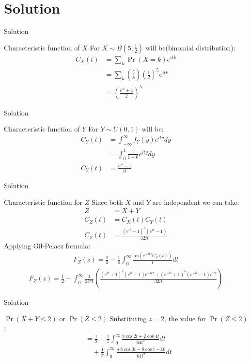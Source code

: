 \documentclass{beamer}
\providecommand{\pr}[1]{\ensuremath{\Pr\left(#1\right)}}
\begin{document}
\section{Solution}
\begin{frame}{Solution}
    \begin{block}{Characteristic function of $X$ }
    For $X \sim B\left(5,\frac{1}{2}\right)$ will be(binomial distribution):
\begin{align}
C_X(t) &= \sum_{k}\pr{X=k}e^{itk}\\
&= \sum_{k}{5 \choose k}{\left(\frac{1}{2}\right)}^5e^{itk}\\
   &=\left(\frac{e^{it}+1}{2}\right)^5
\end{align}
    \end{block}
\end{frame}
\begin{frame}{Solution}
    \begin{block}{Characteristic function of $Y$ }
    For $Y \sim U(0,1)$ will be:
\begin{align}
C_Y(t) &= \int_{-\infty}^\infty f_Y(y)e^{ity}dy\\
&= \int_{0}^1\frac{1}{1-0}e^{ity}dy\\
    C_Y(t)&=\frac{e^{it}-1}{it}
\end{align}
    \end{block}
\end{frame}
\begin{frame}{Solution}
\begin{block}{Characteristic function for $Z$}
Since both $X$ and $Y$ are independent we can take:
\begin{align}
    Z&=X+Y\\
    C_Z(t)&=C_X(t)C_Y(t)\\
    C_Z(t)&= \frac{(e^{it}+1)^5(e^{it}-1)}{32it}
\end{align}
Applying Gil-Pelaez formula:
\begin{align}
    F_Z(z)=\frac{1}{2}-\frac{1}{\pi}\int_0^\infty \frac{\text{Im}\left(e^{-itz}C_Z(t)\right)}{t}dt
\end{align}
\begin{align}
    F_Z(z)=\frac{1}{2}-\int_0^\infty\frac{1}{2i\pi t}\left(\frac{(e^{it}+1)^5(e^{it}-1)e^{-itz}+(e^{-it}+1)^5(e^{-it}-1)e^{itz}}{32it}\right)
\end{align}
\end{block}
\end{frame}
\begin{frame}{Solution}
    \begin{block}{$\pr{X+Y \leq 2}$ or $\pr{Z\leq 2}$}
    Substituting $z=2$, the value for $\pr{Z\leq 2}$:
\begin{align}
\nonumber
    &=\frac{1}{2}+\frac{1}{\pi}\int_0^\infty \frac{8\cos{2t}+2\cos{4t}}{64t^2}dt\\
    &\quad+\frac{1}{\pi}\int_0^\infty\frac{+8\cos{3t}-8\cos{t}-10}{64t^2}dt\label{first_sub}
\end{align}
    \end{block}
\end{frame}
\end{document}
